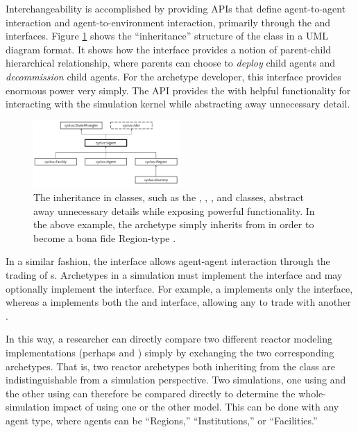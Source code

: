 Interchangeability is accomplished by providing \glspl{API} that define agent-to-agent
interaction and agent-to-environment interaction, primarily through the
 and  interfaces. Figure \ref{fig:agent_uml} shows
the ``inheritance'' structure of the  class in a \gls{UML} diagram
format. It shows how the  interface
provides a notion of parent-child hierarchical relationship, where parents can
choose to \textit{deploy} child agents and \textit{decommission} child
agents. For the archetype developer, this interface provides enormous power
very simply. The \gls{API} provides the  with helpful functionality for
interacting with the \Cyclus simulation kernel while abstracting away unnecessary
detail.

\begin{figure}[htbp!]
\begin{center}
\includegraphics[width=0.5\textwidth]{./images/agent_uml}
\end{center}
\caption{The inheritance in \Cyclus classes, such as the ,
, , and  classes, abstract away
unnecessary details while exposing powerful functionality. In the above
example, the  archetype simply inherits from  in
order to become a bona fide Region-type .}
\label{fig:agent_uml}
\end{figure}

In a similar fashion, the  interface allows agent-agent interaction through the
trading of s. Archetypes in a \Cyclus simulation must
implement the  interface and may optionally implement the
 interface. For example, a  implements only the
 interface, whereas a  implements both the
 and  interface, allowing any  to
trade with another .

In this way, a researcher can directly compare two different reactor modeling
implementations (perhaps  and )
simply by exchanging the two corresponding archetypes. That is, two reactor
archetypes both inheriting from the  class are indistinguishable
from a simulation perspective. Two simulations, one using
 and the other using  can therefore
be compared directly to determine the whole-simulation impact of using one or the other model.
This can be done with any agent type, where agents can be ``Regions,''
``Institutions,'' or ``Facilities.''

